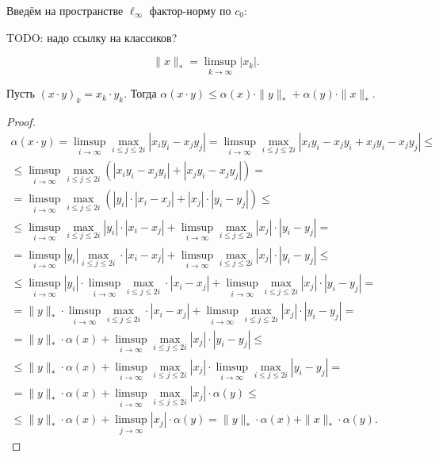 Введём на пространстве $\ell_\infty$ фактор-норму по $c_0$:

TODO: надо ссылку на классиков?

\begin{equation}
	\|x\|_* = \limsup_{k\to\infty} |x_k|
	.
\end{equation}

\begin{theorem}
	\label{thm:alpha_xy}
	Пусть $(x\cdot y)_k = x_k\cdot y_k$.
	Тогда
	$\alpha(x\cdot y)\leq \alpha(x)\cdot \|y\|_* + \alpha(y)\cdot \|x\|_*$.
\end{theorem}

\begin{proof}
	\begin{multline}
		\alpha(x\cdot y)
		=
		\limsup_{i\to\infty} \max_{i\leq j \leq 2i} |x_i y_i - x_j y_j|
		=
		\limsup_{i\to\infty} \max_{i\leq j \leq 2i} |x_i y_i - x_j y_i + x_j y_i - x_j y_j|
		\leq
		\\ \leq
		\limsup_{i\to\infty} \max_{i\leq j \leq 2i} \left(|x_i y_i - x_j y_i| + |x_j y_i - x_j y_j| \right)
		=
		\\=
		\limsup_{i\to\infty} \max_{i\leq j \leq 2i} \left(|y_i|\cdot|x_i - x_j| + |x_j|\cdot|y_i - y_j| \right)
		\leq
		\\ \leq
		\limsup_{i\to\infty} \max_{i\leq j \leq 2i} |y_i|\cdot|x_i - x_j| + \limsup_{i\to\infty} \max_{i\leq j \leq 2i}|x_j|\cdot|y_i - y_j|
		=
		\\ =
		\limsup_{i\to\infty} |y_i| \max_{i\leq j \leq 2i} \cdot|x_i - x_j| + \limsup_{i\to\infty} \max_{i\leq j \leq 2i}|x_j|\cdot|y_i - y_j|
		\leq
		\\ \leq
		\limsup_{i\to\infty} |y_i| \cdot \limsup_{i\to\infty} \max_{i\leq j \leq 2i} \cdot|x_i - x_j| + \limsup_{i\to\infty} \max_{i\leq j \leq 2i}|x_j|\cdot|y_i - y_j|
		=
		\\ =
		\|y\|_* \cdot \limsup_{i\to\infty} \max_{i\leq j \leq 2i} \cdot|x_i - x_j| + \limsup_{i\to\infty} \max_{i\leq j \leq 2i}|x_j|\cdot|y_i - y_j|
		=
		\\ =
		\|y\|_* \cdot \alpha(x) + \limsup_{i\to\infty} \max_{i\leq j \leq 2i}|x_j|\cdot|y_i - y_j|
		\leq
		\\ \leq
		\|y\|_* \cdot \alpha(x) + \limsup_{i\to\infty} \max_{i\leq j \leq 2i}|x_j|\cdot\limsup_{i\to\infty} \max_{i\leq j \leq 2i}|y_i - y_j|
		=
		\\ =
		\|y\|_* \cdot \alpha(x) + \limsup_{i\to\infty} \max_{i\leq j \leq 2i}|x_j|\cdot \alpha(y)
		\leq
		\\ \leq
		\|y\|_* \cdot \alpha(x) + \limsup_{j\to\infty} |x_j|\cdot \alpha(y)
		=
		\|y\|_* \cdot \alpha(x) + \|x\|_* \cdot \alpha(y)
		.
	\end{multline}
\end{proof}

